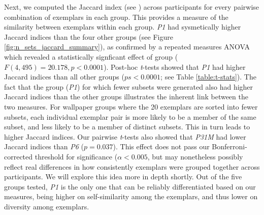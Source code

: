 \documentclass[11pt, twoside]{article}
\begin{document}
Next, we computed the Jaccard index (see ) across participants for every pairwise combination of exemplars in each group. This provides a measure of the similarity between exemplars within each group. \textit{P1} had sysmetically higher Jaccard indices than the four other groups (see Figure \ref{fig:n_sets_jaccard_summary}), as confirmed by a repeated measures ANOVA which revealed a statistically signficant effect of group ($F(4, 495)=20.178, p < 0.0001$). Post-hoc \textit{t}-tests showed that \textit{P1} had higher Jaccard indices than all other groups ($ps < 0.0001$; see Table \ref{table:t-stats}). The fact that the group (\textit{P1}) for which fewer subsets were generated also had higher Jaccard indices than the other groups illustrates the inherent link between the two measures. For wallpaper groups where the 20 exemplars are sorted into fewer subsets, each individual exemplar pair is more likely to be a member of the same subset, and less likely to be a member of distinct subsets. This in turn leads to higher Jaccard indices. Our pairwise \textit{t}-tests also showed that \textit{P31M} had lower Jaccard indices than \textit{P6} ($p = 0.037$). This effect does not pass our Bonferroni-corrected threshold for significance ($\alpha < 0.005$, but may nonetheless possibly reflect real differences in how consistently exemplars were grouped together across participants. We will explore this idea more in depth shortly. Out of the five groups tested, \textit{P1} is the only one that can be reliably differentiated based on our measures, being higher on self-similarity among the exemplars, and thus lower on diversity among exemplars. 
\end{document}
